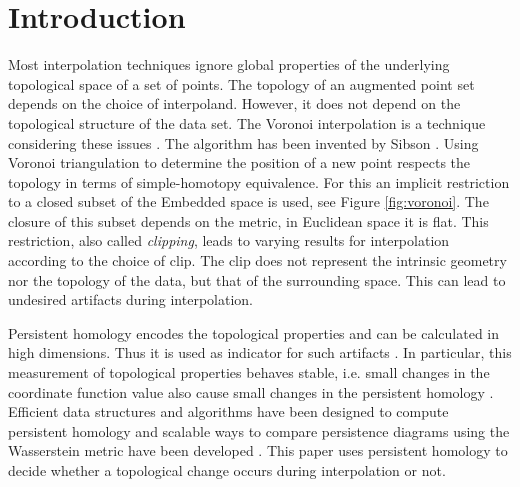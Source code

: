 \documentclass{article}
\begin{document}
\begin{abstract}
In this study the Voronoi interpolation is used to interpolate a set of points  drawn from a topological space with higher homology groups on its filtration. The technique is based on Voronoi tesselation, which induces a natural dual map to the Delaunay triangulation. Advantage is taken from this fact calculating the persistent homology on it after each iteration to capture the changing topology of the data. The boundary points are identified as critical. The Bottleneck and Wasserstein distance serve as a measure of quality between the original point set and the interpolation. If the norm of two distances exceeds a heuristically determined threshold, the algorithm terminates. We give the theoretical basis for this approach and justify its validity with numerical experiments.
\end{abstract}

\section{Introduction}
\label{introduction}
Most interpolation techniques ignore global properties of the underlying topological space of a set of points. The topology of an augmented point set depends on the choice of interpoland. However, it does not depend on the topological structure of the data set. The Voronoi interpolation is a technique considering these issues \cite{Bobach2009}. The algorithm has been invented by Sibson \cite{Sibson}. Using Voronoi triangulation to determine the position of a new point respects the topology in terms of simple-homotopy equivalence. For this an implicit restriction to a closed subset of the Embedded space is used, see Figure \ref{fig:voronoi}. The closure of this subset depends on the metric, in Euclidean space it is flat. This restriction, also called \textit{clipping}, leads to varying results for interpolation according to the choice of clip. The clip does not represent the intrinsic geometry nor the topology of the data, but that of the surrounding space. This can lead to undesired artifacts during interpolation.

Persistent homology encodes the topological properties and can be calculated in high dimensions. Thus it is used as indicator for such artifacts \cite{ZomorodianC05, CarlssonZ09, CarlssonSZ10}. In particular, this measurement of topological properties behaves stable, i.e. small changes in the coordinate function value also cause small changes in the persistent homology \cite{CerriL16}. Efficient data structures and algorithms have been designed to compute persistent homology \cite{Zomorodian10,DevillersMT91} and scalable ways to compare persistence diagrams using the Wasserstein metric have been developed \cite{CarriereCO17}. This paper uses persistent homology to decide whether a topological change occurs during interpolation or not.
\end{document}
